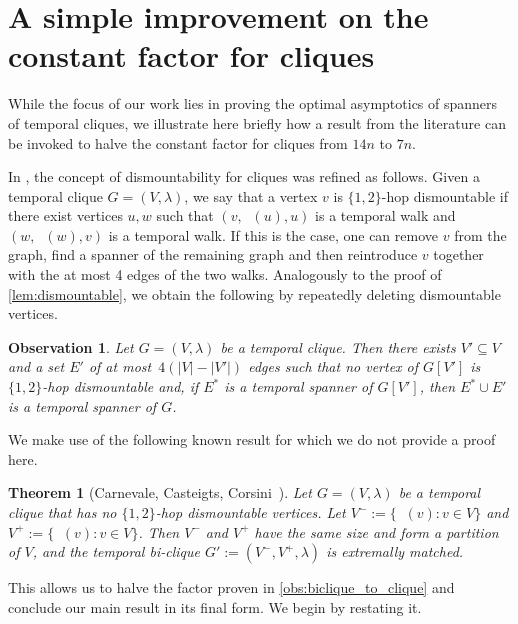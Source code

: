 \documentclass[11pt, letterpaper]{article}
\renewcommand{\subset}{\subseteq}
\DeclareMathOperator{\minmat}{N_{\mathrm{min}}}
\DeclareMathOperator{\maxmat}{N_{\mathrm{max}}}
\theoremstyle{definition}
\theoremstyle{plain}
\newtheorem{theorem}[definition]{Theorem}
\newtheorem{observation}[definition]{Observation}
\begin{document}
\section{A simple improvement on the constant factor for cliques}
\label{sec:improved_factor}

While the focus of our work lies in proving the optimal asymptotics of spanners of temporal cliques, we illustrate here briefly how a result from the literature can be invoked to halve the constant factor for cliques from $14n$ to $7n$.

In \cite{Carnevale25}, the concept of dismountability for cliques was refined as follows.
Given a temporal clique $G=(V,\lambda)$, we say that a vertex $v$ is $\{1,2\}$-hop dismountable if there exist vertices $u,w$ such that $(v,\minmat(u),u)$ is a temporal walk and $(w,\maxmat(w),v)$ is a temporal walk.
If this is the case, one can remove $v$ from the graph, find a spanner of the remaining graph and then reintroduce $v$ together with the at most 4 edges of the two walks.
Analogously to the proof of \cref{lem:dismountable}, we obtain the following by repeatedly deleting dismountable vertices.

\begin{observation}
\label{lem:12dismountable}
Let $G=(V,\lambda)$ be a temporal clique. Then there exists $V'\subset V$ and a set $E'$ of at most~$4(|V|-|V'|)$ edges such that no vertex of $G[V']$ is $\{1,2\}$-hop dismountable and, if $E^*$ is a temporal spanner of $G[V']$, then $E^*\cup E'$ is a temporal spanner of $G$.
\end{observation}

We make use of the following known result for which we do not provide a proof here.

\begin{theorem}[Carnevale, Casteigts, Corsini~{\cite[Corollary 4.1]{Carnevale25}}]
\label{thm:dismountablecliques}
Let $G=(V,\lambda)$ be a temporal clique that has no $\{1,2\}$-hop dismountable vertices.
Let $V^-:=\{\minmat(v): v \in V\}$ and $V^+:=\{\maxmat(v): v \in V\}$.
Then $V^-$ and $V^+$ have the same size and form a partition of $V$, and the temporal bi-clique $G':=(V^-,V^+, \lambda)$ is extremally matched.
\end{theorem}

This allows us to halve the factor proven in \cref{obs:biclique_to_clique} and conclude our main result in its final form.
We begin by restating it.
\end{document}
